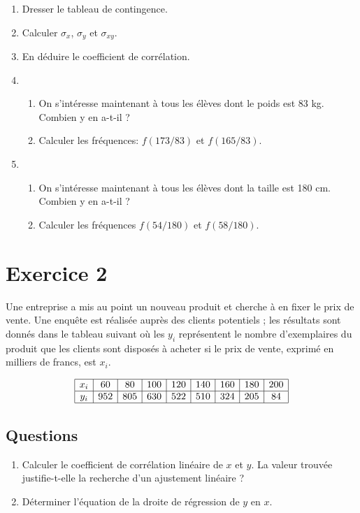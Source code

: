 \documentclass[12pt]{article}
\begin{document}
\begin{enumerate}
\item Dresser le tableau de contingence.
\item Calculer $\sigma_x$, $\sigma_y$ et $\sigma_{xy}$.
\item En déduire le coefficient de corrélation.
\item 
    \begin{enumerate}
    \item On s'intéresse maintenant à tous les élèves dont le poids est 83 kg. Combien y en a-t-il ?
    \item Calculer les fréquences: $f(173/83)$ et $f(165/83)$.
    \end{enumerate}
\item 
    \begin{enumerate}
    \item On s'intéresse maintenant à tous les élèves dont la taille est 180 cm. Combien y en a-t-il ?
    \item Calculer les fréquences $f(54/180)$ et $f(58/180)$.
    \end{enumerate}
\end{enumerate}

\section*{Exercice 2}

Une entreprise a mis au point un nouveau produit et cherche à en fixer le prix de vente. Une enquête est réalisée auprès des clients potentiels ; les résultats sont donnés dans le tableau suivant où les $y_i$ représentent le nombre d'exemplaires du produit que les clients sont disposés à acheter si le prix de vente, exprimé en milliers de francs, est $x_i$.

\[
\begin{array}{|c|c|c|c|c|c|c|c|c|}
\hline
x_i & 60 & 80 & 100 & 120 & 140 & 160 & 180 & 200 \\
\hline
y_i & 952 & 805 & 630 & 522 & 510 & 324 & 205 & 84 \\
\hline
\end{array}
\]

\subsection*{Questions}
\begin{enumerate}
    \item Calculer le coefficient de corrélation linéaire de $x$ et $y$. La valeur trouvée justifie-t-elle la recherche d’un ajustement linéaire ?
    \item Déterminer l’équation de la droite de régression de $y$ en $x$.
\end{enumerate}
\end{document}
